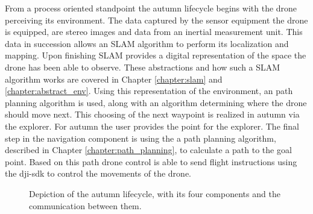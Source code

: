From a process oriented standpoint the autumn lifecycle begins with the drone perceiving its environment. The data captured by the sensor equipment the drone is equipped, are stereo images and data from an inertial measurement unit. This data in succession allows an SLAM algorithm to perform its localization and mapping. Upon finishing SLAM provides a digital representation of the space the drone has been able to observe. These abstractions and how such a SLAM algorithm works are covered in Chapter \ref{chapter:slam} and \ref{chapter:abstract_env}. Using this representation of the environment, an path planning algorithm is used, along with an algorithm determining where the drone should move next. This choosing of the next waypoint is realized in autumn via the explorer. For autumn the user provides the point for the explorer. The final step in the navigation component is using the a path planning algorithm, described in Chapter \ref{chapter:path_planning}, to calculate a path to the goal point. Based on this path drone control is able to send flight instructions using the dji-sdk to control the movements of the drone.

\begin{figure}[h]
	\centering
	
	\caption{Depiction of the autumn lifecycle, with its four components and the communication between them.}
	\label{fig:autumnLifecycle}
\end{figure}


\filbreak